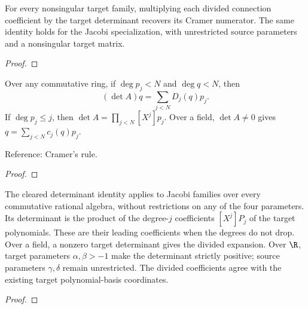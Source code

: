 \begin{supporting}
\begin{definition}
\end{definition}

\begin{theorem}
\label{thm:finite-connection-characterisation}
\leanok
For every nonsingular target family, multiplying each divided connection
coefficient by the target determinant recovers its Cramer numerator.
The same identity holds for the Jacobi specialization, with unrestricted
source parameters and a nonsingular target matrix.
\end{theorem}
\begin{proof}
\leanok
\end{proof}

\begin{theorem}
\label{thm:finite-connections}
\leanok
Over any commutative ring, if $\deg p_j<N$ and $\deg q<N$, then
\[ (\det A)q=\sum_{j<N}D_j(q)p_j. \]
If $\deg p_j\le j$, then $\det A=\prod_{j<N}[X^j]p_j$.
Over a field, $\det A\ne0$ gives $q=\sum_{j<N}c_j(q)p_j$.

Reference: Cramer's rule.
\end{theorem}
\begin{proof}
\leanok
\end{proof}

\begin{theorem}
\label{thm:jacobi-finite-connections}
\leanok
The cleared determinant identity applies to Jacobi families over every
commutative rational algebra, without restrictions on any of the four parameters.
Its determinant is the product of the degree-$j$ coefficients $[X^j]P_j$
of the target polynomials. These are their leading coefficients when the degrees
do not drop. Over a field,
a nonzero target determinant gives the divided expansion.
Over $\R$, target parameters $\alpha,\beta>-1$ make the determinant strictly positive;
source parameters $\gamma,\delta$ remain unrestricted. The divided coefficients
agree with the existing target polynomial-basis coordinates.
\end{theorem}
\begin{proof}
\leanok
\end{proof}


\end{supporting}
